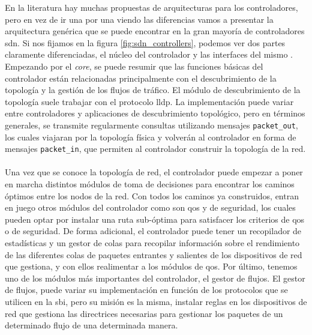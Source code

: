 En la literatura hay muchas propuestas de arquitecturas para los controladores, pero en vez de ir una por una viendo las diferencias vamos a presentar la arquitectura genérica que se puede encontrar en la gran mayoría de controladores \gls{sdn}. Si nos fijamos en la figura \ref{fig:sdn_controllers}, podemos ver dos partes claramente diferenciadas, el núcleo del controlador y las interfaces del mismo \cite{zhu2020sdn}. Empezando por el \textit{core}, se puede resumir que las funciones básicas del controlador están relacionadas principalmente con el descubrimiento de la topología y la gestión de los flujos de tráfico. El módulo de descubrimiento de la topología suele trabajar con el protocolo \gls{lldp}. La implementación puede variar entre controladores y aplicaciones de descubrimiento topológico, pero en términos generales, se transmite regularmente consultas utilizando mensajes \texttt{packet\_out}, los cuales viajaran por la topología física y volverán al controlador en forma de mensajes \texttt{packet\_in}, que permiten al controlador construir la topología de la red.\\
\\
Una vez que se conoce la topología de red, el controlador puede empezar a poner en marcha distintos módulos de toma de decisiones para encontrar los caminos óptimos entre los nodos de la red. Con todos los caminos ya construidos, entran en juego otros módulos del controlador como son \gls{qos} y de seguridad, los cuales pueden optar por instalar una ruta sub-óptima para satisfacer los criterios de \gls{qos} o de seguridad. De forma adicional, el controlador puede tener un recopilador de estadísticas y un gestor de colas para recopilar información sobre el rendimiento de las diferentes colas de paquetes entrantes y salientes de los dispositivos de red que gestiona, y con ellos realimentar a los módulos de \gls{qos}. Por último, tenemos uno de los módulos más importantes del controlador, el gestor de flujos. El gestor de flujos, puede variar su implementación en función de los protocolos que se utilicen en la \gls{sbi}, pero su misión es la misma, instalar reglas en los dispositivos de red que gestiona las directrices necesarias para gestionar los paquetes de un determinado flujo de una determinada manera. \\
\\
